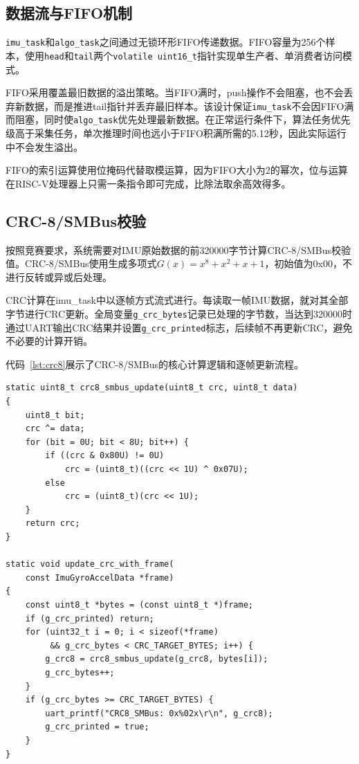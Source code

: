 \documentclass[lettersize,journal]{IEEEtran}
\begin{document}
\subsection{数据流与FIFO机制}

\texttt{imu\_task}和\texttt{algo\_task}之间通过无锁环形FIFO传递数据。FIFO容量为256个样本，使用\texttt{head}和\texttt{tail}两个\texttt{volatile uint16\_t}指针实现单生产者、单消费者访问模式。

FIFO采用覆盖最旧数据的溢出策略。当FIFO满时，push操作不会阻塞，也不会丢弃新数据，而是推进tail指针并丢弃最旧样本。该设计保证\texttt{imu\_task}不会因FIFO满而阻塞，同时使\texttt{algo\_task}优先处理最新数据。在正常运行条件下，算法任务优先级高于采集任务，单次推理时间也远小于FIFO积满所需的5.12秒，因此实际运行中不会发生溢出。

FIFO的索引运算使用位掩码代替取模运算，因为FIFO大小为2的幂次，位与运算在RISC-V处理器上只需一条指令即可完成，比除法取余高效得多。

\subsection{CRC-8/SMBus校验}

按照竞赛要求，系统需要对IMU原始数据的前320000字节计算CRC-8/SMBus校验值。CRC-8/SMBus使用生成多项式$G(x) = x^8 + x^2 + x + 1$，初始值为0x00，不进行反转或异或后处理。

CRC计算在imu\_task中以逐帧方式流式进行。每读取一帧IMU数据，就对其全部字节进行CRC更新。全局变量\texttt{g\_crc\_bytes}记录已处理的字节数，当达到320000时通过UART输出CRC结果并设置\texttt{g\_crc\_printed}标志，后续帧不再更新CRC，避免不必要的计算开销。

代码~\ref{lst:crc8}展示了CRC-8/SMBus的核心计算逻辑和逐帧更新流程。

\begin{lstlisting}[caption={CRC-8/SMBus校验实现（main.c）},label={lst:crc8}]
static uint8_t crc8_smbus_update(uint8_t crc, uint8_t data)
{
    uint8_t bit;
    crc ^= data;
    for (bit = 0U; bit < 8U; bit++) {
        if ((crc & 0x80U) != 0U)
            crc = (uint8_t)((crc << 1U) ^ 0x07U);
        else
            crc = (uint8_t)(crc << 1U);
    }
    return crc;
}

static void update_crc_with_frame(
    const ImuGyroAccelData *frame)
{
    const uint8_t *bytes = (const uint8_t *)frame;
    if (g_crc_printed) return;
    for (uint32_t i = 0; i < sizeof(*frame)
         && g_crc_bytes < CRC_TARGET_BYTES; i++) {
        g_crc8 = crc8_smbus_update(g_crc8, bytes[i]);
        g_crc_bytes++;
    }
    if (g_crc_bytes >= CRC_TARGET_BYTES) {
        uart_printf("CRC8_SMBus: 0x%02x\r\n", g_crc8);
        g_crc_printed = true;
    }
}
\end{lstlisting}
\end{document}
